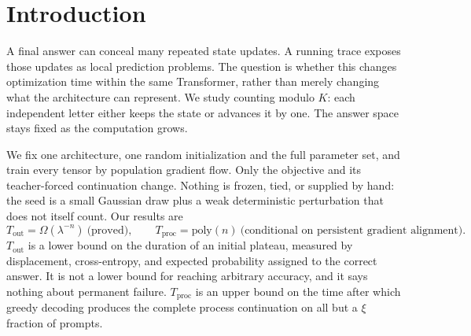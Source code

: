 \begin{abstract}
Can intermediate supervision teach a recurring transition quickly when final-answer supervision supplies exponentially weak credit? We study modular counting in a concrete two-block causal softmax-attention/ReLU Transformer, trained by unrestricted population gradient flow on every parameter from one random seed: small Gaussian weights plus a weak deterministic perturbation, with a zero readout. We prove that outcome supervision stays near this seed, with expected correct-answer probability within $O(\varepsilon\lambda^{n/2})$ of $1/K$, for $\Omega(\lambda^{-n})$ time, with high probability over the seed. For process supervision we prove a conditional result: if the full gradient keeps an inverse-polynomial alignment with some polynomial-norm direction until the loss is small, then flow reaches process loss $\xi\log 2/(n+3)$ in polynomial time, and greedy decoding then produces the entire running-count continuation on a fresh prompt with probability at least $1-\xi$. A readout-separability condition on the evolving hidden features implies this alignment. Proving the alignment from the random seed is left open; we state the measurements that test it. Explicit constructions realize both complete programs in the architecture. Counting measurements and pretrained Qwen2.5-0.5B LoRA experiments support the qualitative mechanism; a five-object BIG-Bench Hard reversal limits its empirical scope.
\end{abstract}

\section{Introduction}
A final answer can conceal many repeated state updates. A running trace exposes those updates as local prediction problems. The question is whether this changes optimization time within the same Transformer, rather than merely changing what the architecture can represent. We study counting modulo $K$: each independent letter either keeps the state or advances it by one. The answer space stays fixed as the computation grows.

We fix one architecture, one random initialization and the full parameter set, and train every tensor by population gradient flow. Only the objective and its teacher-forced continuation change. Nothing is frozen, tied, or supplied by hand: the seed is a small Gaussian draw plus a weak deterministic perturbation that does not itself count. Our results are
\begin{equation}\label{eq:headline}
\boxed{T_{\mathrm{out}}=\Omega(\lambda^{-n})\ \text{(proved)},\qquad T_{\mathrm{proc}}=\mathrm{poly}(n)\ \text{(conditional on persistent gradient alignment)}.}
\end{equation}
$T_{\mathrm{out}}$ is a lower bound on the duration of an initial plateau, measured by displacement, cross-entropy, and expected probability assigned to the correct answer. It is not a lower bound for reaching arbitrary accuracy, and it says nothing about permanent failure. $T_{\mathrm{proc}}$ is an upper bound on the time after which greedy decoding produces the complete process continuation on all but a $\xi$ fraction of prompts.

